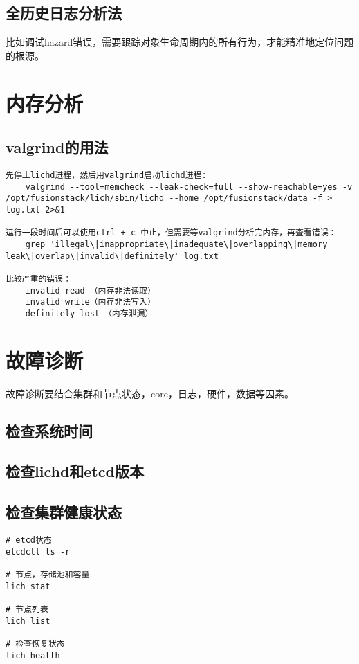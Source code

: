 \subsection{全历史日志分析法}

比如调试hazard错误，需要跟踪对象生命周期内的所有行为，才能精准地定位问题的根源。

\section{内存分析}

\subsection{valgrind的用法}

\begin{lstlisting}
先停止lichd进程，然后用valgrind启动lichd进程:
    valgrind --tool=memcheck --leak-check=full --show-reachable=yes -v /opt/fusionstack/lich/sbin/lichd --home /opt/fusionstack/data -f > log.txt 2>&1

运行一段时间后可以使用ctrl + c 中止，但需要等valgrind分析完内存，再查看错误：
    grep 'illegal\|inappropriate\|inadequate\|overlapping\|memory leak\|overlap\|invalid\|definitely' log.txt

比较严重的错误：　　　
    invalid read （内存非法读取）
    invalid write（内存非法写入）
    definitely lost　（内存泄漏）
\end{lstlisting}

\section{故障诊断}

故障诊断要结合集群和节点状态，core，日志，硬件，数据等因素。

\subsection{检查系统时间}

\subsection{检查lichd和etcd版本}

\subsection{检查集群健康状态}

\begin{lstlisting}
# etcd状态
etcdctl ls -r

# 节点，存储池和容量
lich stat

# 节点列表
lich list

# 检查恢复状态
lich health
\end{lstlisting}

